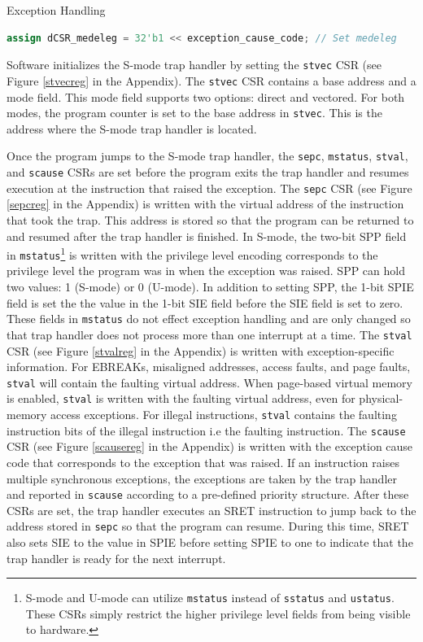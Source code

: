 \documentclass[12pt]{article}
\begin{document}
\begin{section}{Exception Handling}
\begin{lstlisting}[language=Verilog]
assign dCSR_medeleg = 32'b1 << exception_cause_code; // Set medeleg
\end{lstlisting}

Software initializes the S-mode trap handler by setting the {\tt{stvec}} CSR (see Figure \ref{stvecreg} in the Appendix). The {\tt{stvec}} CSR contains a base address and a mode field. This mode field supports two options: direct and vectored. For both modes, the program counter is set to the base address in {\tt{stvec}}. This is the address where the S-mode trap handler is located. 

Once the program jumps to the S-mode trap handler, the {\tt{sepc}}, {\tt{mstatus}}, {\tt{stval}}, and {\tt{scause}} CSRs are set before the program exits the trap handler and resumes execution at the instruction that raised the exception. The {\tt{sepc}} CSR (see Figure \ref{sepcreg} in the Appendix) is written with the virtual address of the instruction that took the trap. This address is stored so that the program can be returned to and resumed after the trap handler is finished. In S-mode, the two-bit SPP field in {\tt{mstatus}}\footnote[1]{S-mode and U-mode can utilize {\tt{mstatus}} instead of {\tt{sstatus}} and {\tt{ustatus}}. These CSRs simply restrict the higher privilege level fields from being visible to hardware.} is written with the privilege level encoding corresponds to the privilege level the program was in when the exception was raised. SPP can hold two values: 1 (S-mode) or 0 (U-mode). In addition to setting SPP, the 1-bit SPIE field is set the the value in the 1-bit SIE field before the SIE field is set to zero. These fields in {\tt{mstatus}} do not effect exception handling and are only changed so that trap handler does not process more than one interrupt at a time. The {\tt{stval}} CSR (see Figure \ref{stvalreg} in the Appendix) is written with exception-specific information. For EBREAKs, misaligned addresses, access faults, and page faults, {\tt{stval}} will contain the faulting virtual address. When page-based virtual memory is enabled, {\tt{stval}} is written with the faulting virtual address, even for physical-memory access exceptions. For illegal instructions, {\tt{stval}} contains the faulting instruction bits of the illegal instruction i.e the faulting instruction. The {\tt{scause}} CSR (see Figure \ref{scausereg} in the Appendix) is written with the exception cause code that corresponds to the exception that was raised. If an instruction raises multiple synchronous exceptions, the exceptions are taken by the trap handler and reported in {\tt{scause}} according to a pre-defined priority structure. After these CSRs are set, the trap handler executes an SRET instruction to jump back to the address stored in {\tt{sepc}} so that the program can resume. During this time, SRET also sets SIE to the value in SPIE before setting SPIE to one to indicate that the trap handler is ready for the next interrupt.


\end{section}
\end{document}
